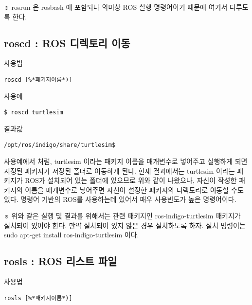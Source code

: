 \vspace{\baselineskip}
\noindent
※ rosrun 은 rosbash 에 포함되나 의미상 ROS 실행 명령어이기 때문에 여기서 다루도록 한다.

\newpage
\subsection{roscd : ROS 디렉토리 이동}

\setcounter{num}{0}

\circled{\thenum} 사용법
\begin{lstlisting}[language=ROS]
roscd [%*패키지이름*)]
\end{lstlisting}

\noindent
{}\circled{\thenum} 사용예
\begin{lstlisting}[language=ROS]
$ roscd turtlesim
\end{lstlisting}

\noindent
{}\circled{\thenum} 결과값
\begin{lstlisting}[language=ROS]
/opt/ros/indigo/share/turtlesim$
\end{lstlisting}

\noindent
사용예에서 처럼, turtlesim 이라는 패키지 이름을 매개변수로 넣어주고 실행하게 되면 지정된 패키지가 저장된 폴더로 이동하게 된다. 현재 결과에서는 turtlesim 이라는 패키지가 ROS가 설치되어 있는 폴더에 있으므로 위와 같이 나왔으나, 자신이 작성한 패키지의 이름을 매개변수로 넣어주면 자신이 설정한 패키지의 디렉토리로 이동할 수도 있다. 명령어 기반의 ROS를 사용하는데 있어서 매우 사용빈도가 높은 명령어이다.

\vspace{\baselineskip}
\noindent
※ 위와 같은 실행 및 결과를 위해서는 관련 패키지인 ros-indigo-turtlesim 패키지가 설치되어 있어야 한다. 만약 설치되어 있지 않은 경우 설치하도록 하자. 설치 명령어는 sudo apt-get install ros-indigo-turtlesim  이다.

\subsection{rosls : ROS 리스트 파일}

\setcounter{num}{0}

\circled{\thenum} 사용법
\begin{lstlisting}[language=ROS]
rosls [%*패키지이름*)]
\end{lstlisting}


